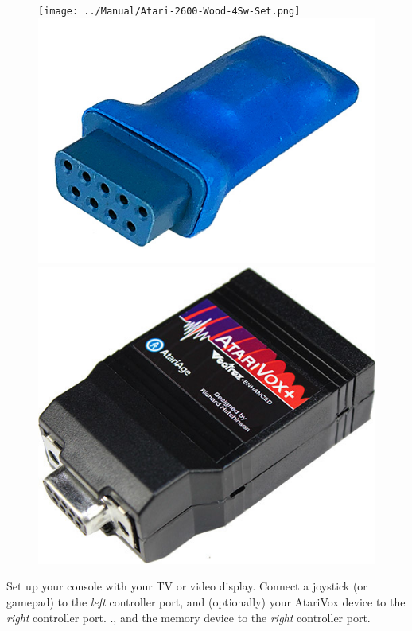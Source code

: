 \documentclass[9pt,twocolumn,openany,article]{memoir}
\begin{document}
\ifdefined\ATARIAGESAVE\else
\ifdefined\NOSAVE\else
\begin{figure}[b]
  \begin{center}
    \ifdefined\ATARIAGESAVE
    \texttt{[image: ../Manual/Atari-2600-Wood-4Sw-Set.png]}
    \else
    \includegraphics[width=\columnwidth]{../Manual/SaveKey.jpeg}
    \fi
    \includegraphics[width=.75\columnwidth]{../Manual/AtariVox.jpeg}
  \end{center}
\end{figure}
\fi
\fi

Set up  your console with your  TV or video display.  Connect a joystick
(or gamepad) to  the \emph{left} controller port\ifdefined\ATARIAGESAVE,
and  (optionally) your  AtariVox device  to the  \emph{right} controller
port.  \else\ifdefined\NOSAVE.\else{},  and  the memory  device  to  the
\emph{right} controller port.
\end{document}
